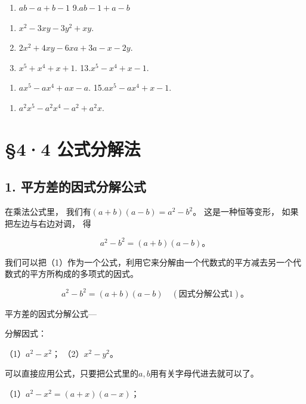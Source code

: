 \begin{enumerate}[start=8]
\item
  \(ab - a + b - 1\) 9.\(ab - 1 + a - b\)
\end{enumerate}

\begin{enumerate}[start=10]
\item
  \(x^{2} - 3xy - 3y^{2} + xy.\)
\item
  \(2x^{2} + 4xy - 6xa + 3a - x - 2y.\)
\item
  \(x^{5} + x^{4} + x + 1.\) 13.\(x^{5} - x^{4} + x - 1.\)
\end{enumerate}

\begin{enumerate}[start=14]
\item
  \(ax^5 - ax^4 + ax - a.\) 15.\(ax^5 - ax^4 + x - 1.\)
\end{enumerate}

\begin{enumerate}[start=16]
\item
  \(a^2 x^5 - a^2 x^4 - a^2 + a^2 x.\)
\end{enumerate}

\section{§4·4 公式分解法}

\subsection{1. 平方差的因式分解公式}

在乘法公式里， 我们有\((a + b)(a - b) = a^2 - b^2\)。 这是一种恒等变形，
如果把左边与右边对调， 得

\[
a ^{2} - b ^{2} = (a + b) (a - b)\text{。} \tag {1}
\]

我们可以把（1）作为一个公式，利用它来分解由一个代数式的平方减去另一个代数式的平方所构成的多项式的因式。

\[
a ^{2} - b ^{2} = (a + b) (a - b) \quad (\text{因式分解公式1})\text{。}
\]

平方差的因式分解公式---

 分解因式：

（1）\(a^2 - x^2\)； （2）\(x^2 - y^2\)。

可以直接应用公式，只要把公式里的\(a, b\)用有关字母代进去就可以了。

 （1）\(a^2 - x^2 = (a + x)(a - x)\)；

